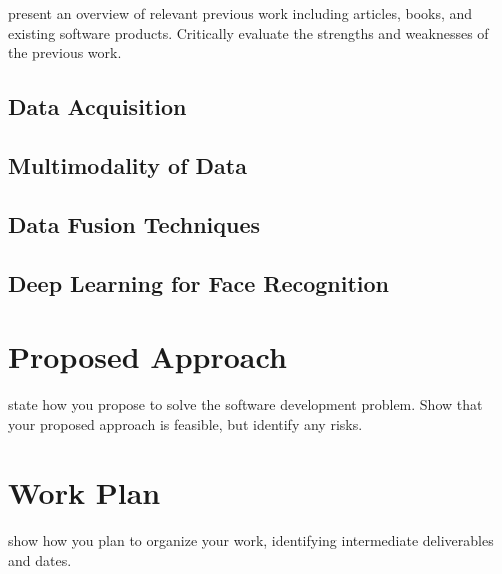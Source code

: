 \documentclass{interim}
\begin{document}
present an overview of relevant previous work including articles, books, and existing software products. Critically evaluate the strengths and weaknesses of the previous work.

\subsection{Data Acquisition}

\subsection{Multimodality of Data}

\subsection{Data Fusion Techniques}

\subsection{Deep Learning for Face Recognition}

\section{Proposed Approach}

state how you propose to solve the software development problem. Show that your proposed approach is feasible, but identify any risks.

\section{Work Plan}

show how you plan to organize your work, identifying intermediate deliverables and dates.



\end{document}
